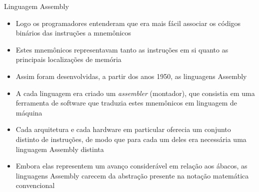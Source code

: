 \begin{frame}[fragile]{Linguagem Assembly}

    \begin{itemize}
        \item Logo os programadores entenderam que era mais fácil associar os códigos binários
            das instruções a mnemônicos

        \item Estes mnemônicos representavam tanto as instruções em si quanto as principais 
            localizações de memória

        \item Assim foram desenvolvidas, a partir dos anos 1950, as linguagens Assembly

        \item A cada linguagem era criado um \textit{assembler} (montador), que consistia em 
            uma ferramenta de software que traduzia estes mnemônicos em linguagem de máquina

        \item Cada arquitetura e cada hardware em particular oferecia um conjunto distinto de
            instruções, de modo que para cada um deles era necessária uma linguagem Assembly
            distinta

        \item Embora elas representem um avanço considerável em relação aos ábacos, as linguagens
            Assembly carecem da abstração presente na notação matemática convencional
    \end{itemize}

\end{frame}
